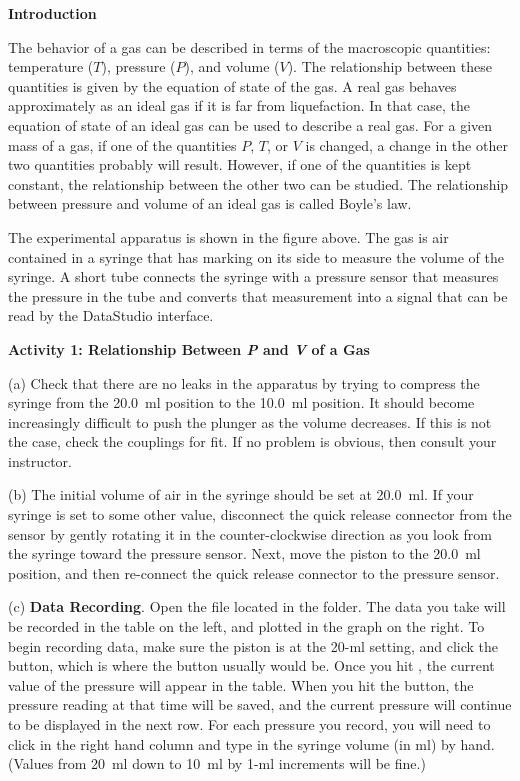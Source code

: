 \textbf{Introduction}

The behavior of a gas can be described in terms of the macroscopic quantities:
temperature ($T$), pressure ($P$), and volume ($V$). The relationship between these
quantities is given by the equation of state of the gas. A real gas behaves
approximately as an ideal gas if it is far from liquefaction. In that case,
the equation of state of an ideal gas can be used to describe a real gas. For
a given mass of a gas, if one of the quantities $P$, $T$, or $V$ is changed, a change
in the other two quantities probably will result. However, if one of the quantities
is kept constant, the relationship between the other two can be studied. The
relationship between pressure and volume of an ideal gas is called Boyle's law.

The experimental apparatus is shown in the figure above. The gas is air contained
in a syringe that has marking on its side to measure the volume of the syringe.
A short tube connects the syringe with a pressure sensor that measures the pressure
in the tube and converts that measurement into a signal that can be read by
the DataStudio interface.

\textbf{Activity 1: Relationship Between \textit{P} and \textit{V} of a Gas}

(a) Check that there are no leaks in the apparatus by trying to compress
the syringe from the 20.0~ml position to the 10.0~ml position. It should become
increasingly difficult to push the plunger as the volume decreases. If this
is not the case, check the couplings for fit. If no problem is obvious, then
consult your instructor. 
\vspace{20mm}

(b) The initial volume of air in the syringe should be set at 20.0~ml. If your
syringe is set to some other value, disconnect the quick release connector from
the sensor by gently rotating it in the counter-clockwise direction as you look
from the syringe toward the pressure sensor. Next, move the piston to the
20.0~ml position, and then re-connect the quick release connector to the pressure
sensor. 

(c) \textbf{Data Recording}. Open the file  located in the 
\filename{\coursefolder} folder.  The data you take will be recorded in the table on the left, and plotted in the graph on the right.  To begin recording data, make sure the piston is at the 20-ml setting, and click
the  button, which is where the  button usually would be. 
Once you hit , the current value of the pressure will appear in the table.  
When you hit the  button, the pressure reading at that time will be saved, and the current pressure will continue to be displayed in the next row.  For each pressure you record, you will need to click in the right hand column and type in the syringe volume (in ml) by hand.  (Values from 20~ml down to 10~ml by 1-ml increments will be fine.)

